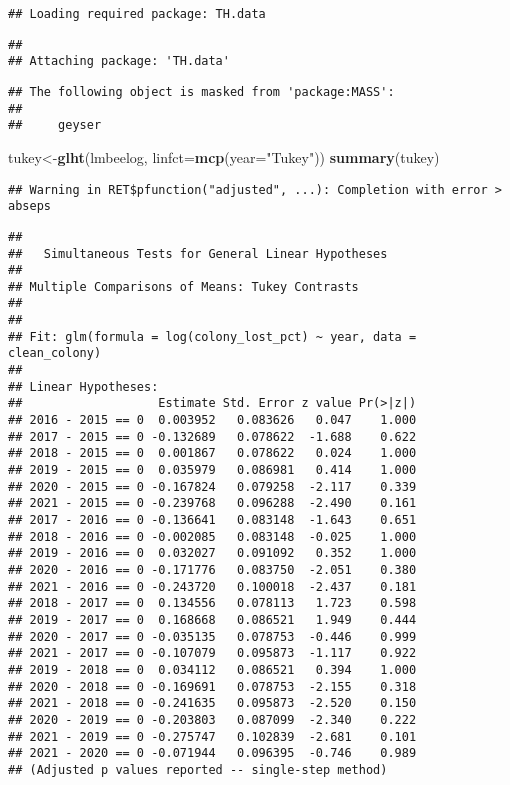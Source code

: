\documentclass[
]{article}
\newenvironment{Shaded}{\begin{snugshade}}{\end{snugshade}}
\newcommand{\AttributeTok}[1]{\textcolor[rgb]{0.13,0.29,0.53}{#1}}
\newcommand{\FunctionTok}[1]{\textcolor[rgb]{0.13,0.29,0.53}{\textbf{#1}}}
\newcommand{\NormalTok}[1]{#1}
\newcommand{\OtherTok}[1]{\textcolor[rgb]{0.56,0.35,0.01}{#1}}
\newcommand{\StringTok}[1]{\textcolor[rgb]{0.31,0.60,0.02}{#1}}
\begin{document}
\begin{verbatim}
## Loading required package: TH.data
\end{verbatim}

\begin{verbatim}
## 
## Attaching package: 'TH.data'
\end{verbatim}

\begin{verbatim}
## The following object is masked from 'package:MASS':
## 
##     geyser
\end{verbatim}

\begin{Shaded}
\begin{Highlighting}[]
\NormalTok{tukey}\OtherTok{\textless{}{-}}\FunctionTok{glht}\NormalTok{(lmbeelog, }\AttributeTok{linfct=}\FunctionTok{mcp}\NormalTok{(}\AttributeTok{year=}\StringTok{"Tukey"}\NormalTok{))}
\FunctionTok{summary}\NormalTok{(tukey)}
\end{Highlighting}
\end{Shaded}

\begin{verbatim}
## Warning in RET$pfunction("adjusted", ...): Completion with error > abseps
\end{verbatim}

\begin{verbatim}
## 
##   Simultaneous Tests for General Linear Hypotheses
## 
## Multiple Comparisons of Means: Tukey Contrasts
## 
## 
## Fit: glm(formula = log(colony_lost_pct) ~ year, data = clean_colony)
## 
## Linear Hypotheses:
##                   Estimate Std. Error z value Pr(>|z|)
## 2016 - 2015 == 0  0.003952   0.083626   0.047    1.000
## 2017 - 2015 == 0 -0.132689   0.078622  -1.688    0.622
## 2018 - 2015 == 0  0.001867   0.078622   0.024    1.000
## 2019 - 2015 == 0  0.035979   0.086981   0.414    1.000
## 2020 - 2015 == 0 -0.167824   0.079258  -2.117    0.339
## 2021 - 2015 == 0 -0.239768   0.096288  -2.490    0.161
## 2017 - 2016 == 0 -0.136641   0.083148  -1.643    0.651
## 2018 - 2016 == 0 -0.002085   0.083148  -0.025    1.000
## 2019 - 2016 == 0  0.032027   0.091092   0.352    1.000
## 2020 - 2016 == 0 -0.171776   0.083750  -2.051    0.380
## 2021 - 2016 == 0 -0.243720   0.100018  -2.437    0.181
## 2018 - 2017 == 0  0.134556   0.078113   1.723    0.598
## 2019 - 2017 == 0  0.168668   0.086521   1.949    0.444
## 2020 - 2017 == 0 -0.035135   0.078753  -0.446    0.999
## 2021 - 2017 == 0 -0.107079   0.095873  -1.117    0.922
## 2019 - 2018 == 0  0.034112   0.086521   0.394    1.000
## 2020 - 2018 == 0 -0.169691   0.078753  -2.155    0.318
## 2021 - 2018 == 0 -0.241635   0.095873  -2.520    0.150
## 2020 - 2019 == 0 -0.203803   0.087099  -2.340    0.222
## 2021 - 2019 == 0 -0.275747   0.102839  -2.681    0.101
## 2021 - 2020 == 0 -0.071944   0.096395  -0.746    0.989
## (Adjusted p values reported -- single-step method)
\end{verbatim}
\end{document}
